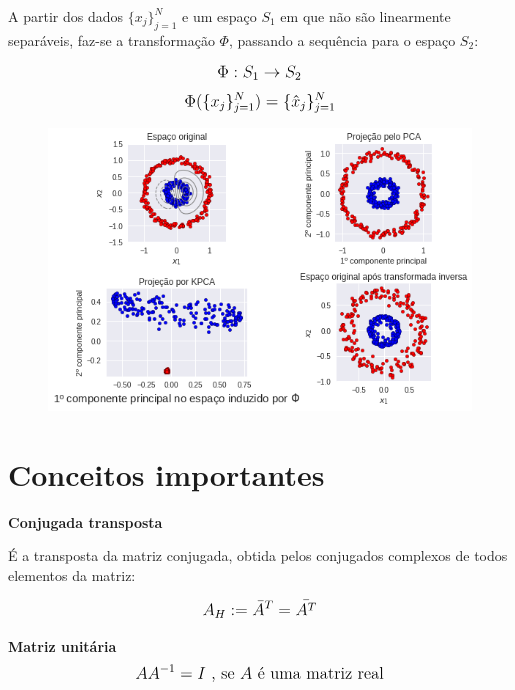 \documentclass{article}
\begin{document}
A partir dos dados $\{ x_j \}_{j=1}^{N}$ e um espaço $S_1$ em que não são linearmente separáveis, faz-se a transformação $\Phi$, passando a sequência para o espaço $S_2$:

\begin{equation}
\mathlarger{
\Phi: S_1 \rightarrow S_2
}
\end{equation}
\begin{equation}
\mathlarger{
\Phi (\{ x_j \}_{j=1}^{N} ) = \{ \hat{x}_j \}_{j=1}^{N}
}
\end{equation}

\begin{figure}[!ht]
\begin{center}
  \includegraphics[width=0.8\linewidth]{images/kernel_pca.png}
\end{center}
\end{figure}

\pagebreak

\section{Conceitos importantes}

\hfill

\textbf{Conjugada transposta}

É a transposta da matriz conjugada, obtida pelos conjugados complexos de todos elementos da matriz:

\begin{equation}
\mathlarger{
A_H := \bar{A}^T = \bar{A^T}
}
\end{equation}

\hfill

\textbf{Matriz unitária}
\begin{equation}
\mathlarger{
A A^{-1} = I \text{ , se } A \text{ é uma matriz real}
}
\end{equation}
\end{document}
